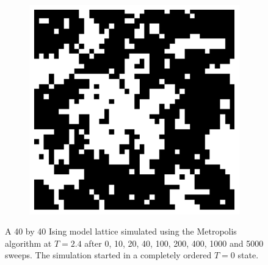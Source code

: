 \documentclass[11pt, a4paper]{report} %
\begin{document}
\begin{figure}[htb]
\begin{subfigure}[c]{0.2\linewidth}
	\end{subfigure}
	~
	\begin{subfigure}[c]{0.2\linewidth}
		\includegraphics[width=\linewidth]{20160603125722_40_by_40_Lattice_step5000.pdf}
	\end{subfigure}
	\caption{A 40 by 40 Ising model lattice simulated using the Metropolis algorithm at \(T=2.4\) after 0, 10, 20, 40, 100, 200, 400, 1000	and 5000 sweeps. The simulation started in a completely ordered \(T=0\) state.}
	\label{fig:metropolis_ising_at_steps}
\end{figure}
\end{document}
